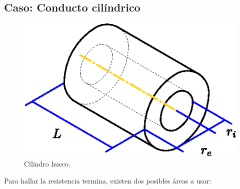 \subsection{Caso: Conducto cilíndrico}
\begin{figure}[!h]
\centering
\includegraphics[scale=1.10]{figura02_10.eps}
\caption{Cilindro hueco.}
\end{figure}

Para hallar la resistencia termina, existen dos posibles áreas a usar:

